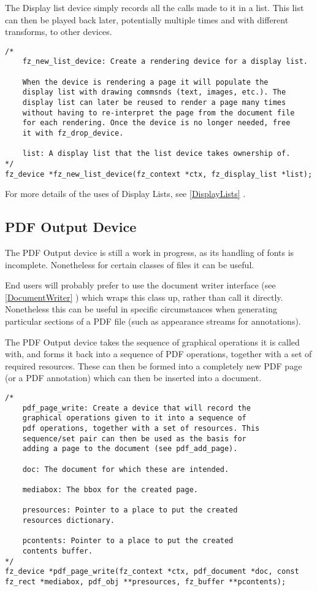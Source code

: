 \documentclass[oneside]{book}
\newcommand{\rjwref}[1] {\autoref{#1} \nameref{#1}}
\begin{document}
The Display list device simply records all the calls made to it in a list. This list can then be played back later, potentially multiple times and with different transforms, to other devices.

\begin{lstlisting}
/*
	fz_new_list_device: Create a rendering device for a display list.

	When the device is rendering a page it will populate the
	display list with drawing commsnds (text, images, etc.). The
	display list can later be reused to render a page many times
	without having to re-interpret the page from the document file
	for each rendering. Once the device is no longer needed, free
	it with fz_drop_device.

	list: A display list that the list device takes ownership of.
*/
fz_device *fz_new_list_device(fz_context *ctx, fz_display_list *list);
\end{lstlisting}

For more details of the uses of Display Lists, see \rjwref{DisplayLists}.

\subsection{PDF Output Device}
\label{PDFDevice}

The PDF Output device is still a work in progress, as its handling of fonts is incomplete. Nonetheless for certain classes of files it can be useful.

End users will probably prefer to use the document writer interface (see \rjwref{DocumentWriter}) which wraps this class up, rather than call it directly. Nonetheless this can be useful in specific circumstances when generating particular sections of a PDF file (such as appearance streams for annotations).

The PDF Output device takes the sequence of graphical operations it is called with, and forms it back into a sequence of PDF operations, together with a set of required resources. These can then be formed into a completely new PDF page (or a PDF annotation) which can then be inserted into a document.

\begin{lstlisting}
/*
	pdf_page_write: Create a device that will record the
	graphical operations given to it into a sequence of
	pdf operations, together with a set of resources. This
	sequence/set pair can then be used as the basis for
	adding a page to the document (see pdf_add_page).
	
	doc: The document for which these are intended.

	mediabox: The bbox for the created page.

	presources: Pointer to a place to put the created
	resources dictionary.

	pcontents: Pointer to a place to put the created
	contents buffer.
*/
fz_device *pdf_page_write(fz_context *ctx, pdf_document *doc, const fz_rect *mediabox, pdf_obj **presources, fz_buffer **pcontents);
\end{lstlisting}
\end{document}

